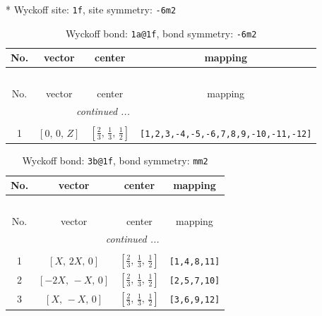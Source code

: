 \documentclass[fleqn,8pt]{jsarticle}
\begin{document}
* Wyckoff site: {\tt 1f}, site symmetry: {\tt -6m2}
\renewcommand{\arraystretch}{1.2}
\begin{longtable}{cccc}
\caption{Wyckoff bond: {\tt 1a@1f}, bond symmetry: {\tt -6m2}}
 \\
 \hline \hline
No. & vector & center & mapping \\ \hline \endfirsthead

\multicolumn{3}{l}{\tablename\ \thetable{}} \\
 \hline \hline
No. & vector & center & mapping \\ \hline \endhead

 \hline \hline
\multicolumn{3}{r}{\footnotesize\it continued ...} \\ \endfoot

 \hline \hline
\multicolumn{3}{r}{} \\ \endlastfoot

1 & $\left[ 0,\, 0,\, Z \right]$ & $\left[ \frac{2}{3},\, \frac{1}{3},\, \frac{1}{2} \right]$ & {\tt [1,2,3,-4,-5,-6,7,8,9,-10,-11,-12]} \\
\end{longtable}
\renewcommand{\arraystretch}{1.2}
\begin{longtable}{cccc}
\caption{Wyckoff bond: {\tt 3b@1f}, bond symmetry: {\tt mm2}}
 \\
 \hline \hline
No. & vector & center & mapping \\ \hline \endfirsthead

\multicolumn{3}{l}{\tablename\ \thetable{}} \\
 \hline \hline
No. & vector & center & mapping \\ \hline \endhead

 \hline \hline
\multicolumn{3}{r}{\footnotesize\it continued ...} \\ \endfoot

 \hline \hline
\multicolumn{3}{r}{} \\ \endlastfoot

1 & $\left[ X,\, 2 X,\, 0 \right]$ & $\left[ \frac{2}{3},\, \frac{1}{3},\, \frac{1}{2} \right]$ & {\tt [1,4,8,11]} \\ \hline
2 & $\left[ - 2 X,\, - X,\, 0 \right]$ & $\left[ \frac{2}{3},\, \frac{1}{3},\, \frac{1}{2} \right]$ & {\tt [2,5,7,10]} \\ \hline
3 & $\left[ X,\, - X,\, 0 \right]$ & $\left[ \frac{2}{3},\, \frac{1}{3},\, \frac{1}{2} \right]$ & {\tt [3,6,9,12]} \\
\end{longtable}
\end{document}
